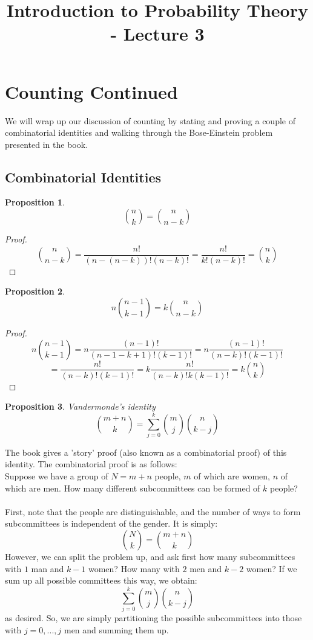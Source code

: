 \documentclass[12pt]{article} %
\title{Introduction to Probability Theory - Lecture 3}
\newtheorem{prop}{Proposition}
\begin{document}
\maketitle
\section{Counting Continued}
We will wrap up our discussion of counting by stating and proving a couple of combinatorial identities and walking through the Bose-Einstein problem presented in the book.
\subsection{Combinatorial Identities}
\begin{prop}
$${n\choose {k}} = {n\choose{n-k}}$$
\end{prop}
\begin{proof}
$${n\choose{n-k}} = \frac{n!}{(n-(n-k))!(n-k)!} = \frac{n!}{k!(n-k)!} = {n\choose{k}}$$
\end{proof}
\begin{prop}
$$n{{n-1}\choose{k-1}} = k{n\choose{n-k}}$$
\end{prop}
\begin{proof}
$$n{{n-1}\choose{k-1}} = n\frac{(n-1)!}{(n-1-k+1)!(k-1)!} = n\frac{(n-1)!}{(n-k)!(k-1)!} $$
$$= \frac{n!}{(n-k)!(k-1)!} = k\frac{n!}{(n-k)!k(k-1)!}= k{n\choose{k}}$$
\end{proof}
\begin{prop}{Vandermonde's identity}
$${{m+n}\choose{k}} = \sum_{j=0}^k{m\choose{j}}{n\choose{k-j}}$$
\end{prop}
The book gives a 'story' proof (also known as a combinatorial proof) of this identity. The combinatorial proof is as follows:\\

Suppose we have a group of $N=m+n$ people, $m$ of which are women, $n$ of which are men. How many different subcommittees can be formed of $k$ people?\\\\
First, note that the people are distinguishable, and the number of ways to form subcommittees is independent of the gender. It is simply:
$${{N}\choose{k}} = {{m+n}\choose{k}}$$
However, we can split the problem up, and ask first how many subcommittees with $1$ man and $k-1$ women? How many with $2$ men and $k-2$ women? If we sum up all possible committees this way, we obtain:
$$\sum_{j=0}^k {m\choose{j}}{n\choose{k-j}}$$
as desired. So, we are simply partitioning the possible subcommittees into those with $j=0,...,j$ men and summing them up. 
\end{document}
